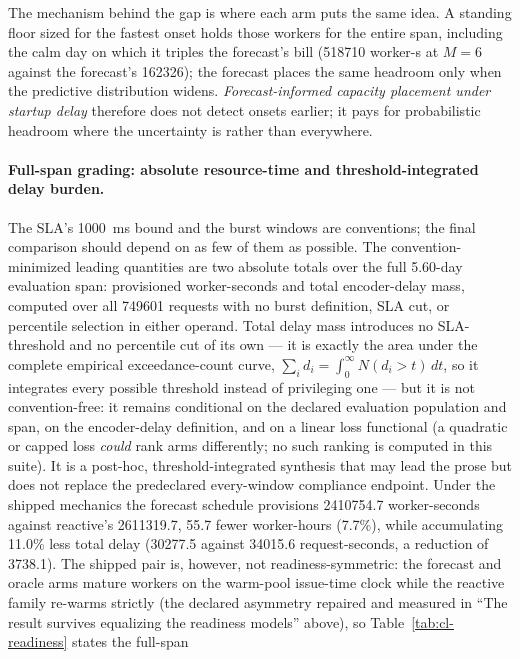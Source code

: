The mechanism behind the gap is where each arm puts the same idea. A standing
floor sized for the fastest onset holds those workers for the entire span,
including the calm day on which it triples the forecast's bill
(\SI{518710}{} worker-s at $M{=}6$
against the forecast's \SI{162326}{}); the forecast places the same headroom
only when the predictive distribution widens.
\emph{Forecast-informed capacity placement under startup delay} therefore does
not detect onsets earlier; it pays for probabilistic
headroom where the uncertainty is rather than everywhere.

\paragraph{Full-span grading: absolute resource-time and
threshold-integrated delay burden.} The SLA's \SI{1000}{\milli\second}
bound and the burst windows are conventions; the final comparison should
depend on as few of them as possible. The convention-minimized leading
quantities are two absolute totals over the full 5.60-day evaluation span:
provisioned worker-seconds and total encoder-delay mass, computed over
all \num{749601} requests with no burst definition, SLA cut, or percentile
selection in either operand. Total delay mass introduces no SLA-threshold
and no percentile cut of its own --- it is exactly the area under the
complete empirical exceedance-count
curve, $\sum_i d_i = \int_0^\infty N(d_i > t)\,dt$, so it integrates every
possible threshold instead of privileging one --- but it is not
convention-free: it remains conditional on the declared evaluation
population and span, on the encoder-delay definition, and on a linear loss
functional (a quadratic or capped loss \emph{could} rank arms differently; no
such ranking is computed in this suite). It is a post-hoc,
threshold-integrated synthesis that may lead the prose but does not
replace the predeclared every-window compliance endpoint. Under the
shipped mechanics the forecast schedule provisions \num{2410754.7}
worker-seconds against reactive's \num{2611319.7}, \num{55.7} fewer
worker-hours (7.7\%), while accumulating 11.0\% less total delay
(\num{30277.5} against \num{34015.6} request-seconds, a reduction of
\num{3738.1}). The shipped pair is, however, not readiness-symmetric: the
forecast and oracle arms mature workers on the warm-pool issue-time clock
while the reactive family re-warms strictly (the declared asymmetry
repaired and measured in ``The result survives equalizing the readiness
models'' above), so Table~\ref{tab:cl-readiness} states the full-span
